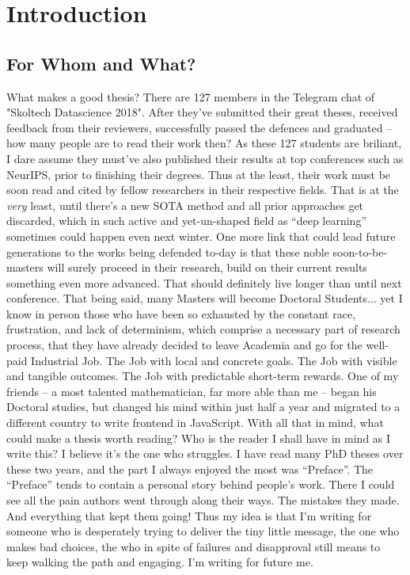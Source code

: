 \chapter{Introduction}


\section*{For Whom and What?}

What makes a good thesis? There are 127 members in the Telegram chat of
"Skoltech Datascience 2018". After they've submitted their great theses,
received feedback from their reviewers, successfully passed the defences and
graduated -- how many people are to read their work then? As these 127 students
are briliant, I dare assume they must've also published their results at top
conferences such as NeurIPS, prior to finishing their degrees. Thus at the
least, their work must be soon read and cited by fellow researchers in their
respective fields.  That is at the \emph{very} least, until there's a new SOTA
method and all prior approaches get discarded, which in such active and
yet-un-shaped field as ``deep learning'' sometimes could happen even next
winter. One more link that could lead future generations to the works being
defended to-day is that these noble soon-to-be-masters will surely proceed in
their research, build on their current results something even more advanced.
That should definitely live longer than until next conference.  That being
said, many Masters will become Doctoral Students... yet I know in person those
who have been so exhausted by the constant race, frustration, and lack of
determinism, which comprise a necessary part of research process, that they
have already decided to leave Academia and go for the well-paid Industrial Job.
The Job with local and concrete goals.  The Job with visible and tangible
outcomes. The Job with predictable short-term rewards. 
One of my friends -- a most talented mathematician, far more able than me
-- began his Doctoral studies, but changed his mind within just half a year and
migrated to a different country to write frontend in JavaScript.
With all that in mind, what could make a thesis worth reading? Who is the
reader I shall have in mind as I write this? I believe it's the one who
struggles. I have read many PhD theses over these two years, and the part I
always enjoyed the most was ``Preface''. The ``Preface'' tends to contain a
personal story behind people's work. There I could see all the pain authors
went through along their ways. The mistakes they made. And everything that kept
them going!  Thus my idea is that I'm writing for someone who is desperately
trying to deliver the tiny little message, the one who makes bad choices, the
who in spite of failures and disapproval still means to keep walking the path
and engaging. I'm writing for future me.

